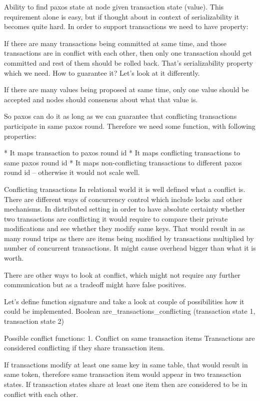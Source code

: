 Ability to find paxos state at node given transaction state (value).
This requirement alone is easy, but if thought about in context of serializability it becomes quite hard. In order to support transactions we need to have property:


If there are many transactions being committed at same time, and those transactions are in conflict with each other, then only one transaction should get committed and rest of them should be rolled back. 
That’s serializability property which we need. How to guarantee it? Let’s look at it differently.


If there are many values being proposed at same time, only one value should be accepted and nodes should consensus about what that value is.


So paxos can do it as long as we can guarantee that conflicting transactions participate in same paxos round. Therefore we need some function, with following properties:


* It maps transaction to paxos round id
* It maps conflicting transactions to same paxos round id 
* It maps non-conflicting transactions to different paxos round id -- otherwise it would not scale well.


Conflicting transactions
In relational world it is well defined what a conflict is. There are different ways of concurrency control which include locks and other mechanisms. In distributed setting in order to have absolute certainty whether two transactions are conflicting it would require to compare their private modifications and see whether they modify same keys. That would result in as many round trips as there are items being modified by transactions multiplied by number of concurrent transactions. It might cause overhead bigger than what it is worth. 


There are other ways to look at conflict, which might not require any further communication but as a tradeoff might have false positives. 


Let’s define function signature and take a look at couple of possibilities how it could be implemented.
Boolean are_transactions_conflicting (transaction state 1, transaction state 2)


Possible conflict functions:
1. Conflict on same transaction items
Transactions are considered conflicting if they share transaction item.


If transactions modify at least one same key in same table, that would result in same token, therefore same transaction item would appear in two transaction states. If transaction states share at least one item then are considered to be in conflict with each other.


